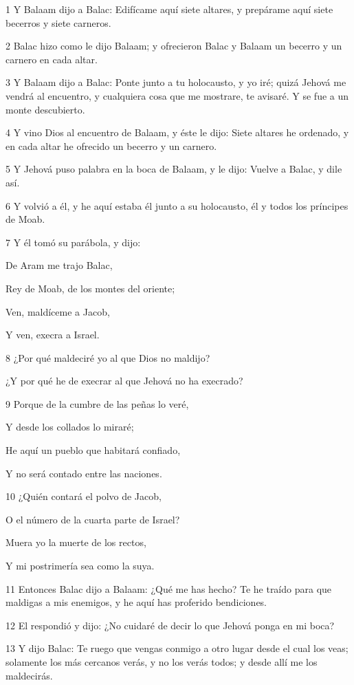 \par 1 Y Balaam dijo a Balac: Edifícame aquí siete altares, y prepárame aquí siete becerros y siete carneros.
\par 2 Balac hizo como le dijo Balaam; y ofrecieron Balac y Balaam un becerro y un carnero en cada altar.
\par 3 Y Balaam dijo a Balac: Ponte junto a tu holocausto, y yo iré; quizá Jehová me vendrá al encuentro, y cualquiera cosa que me mostrare, te avisaré. Y se fue a un monte descubierto.
\par 4 Y vino Dios al encuentro de Balaam, y éste le dijo: Siete altares he ordenado, y en cada altar he ofrecido un becerro y un carnero.
\par 5 Y Jehová puso palabra en la boca de Balaam, y le dijo: Vuelve a Balac, y dile así.
\par 6 Y volvió a él, y he aquí estaba él junto a su holocausto, él y todos los príncipes de Moab.
\par 7 Y él tomó su parábola, y dijo:
\par De Aram me trajo Balac,
\par Rey de Moab, de los montes del oriente;
\par Ven, maldíceme a Jacob,
\par Y ven, execra a Israel.
\par 8 ¿Por qué maldeciré yo al que Dios no maldijo?
\par ¿Y por qué he de execrar al que Jehová no ha execrado?
\par 9 Porque de la cumbre de las peñas lo veré,
\par Y desde los collados lo miraré;
\par He aquí un pueblo que habitará confiado,
\par Y no será contado entre las naciones.
\par 10 ¿Quién contará el polvo de Jacob,
\par O el número de la cuarta parte de Israel?
\par Muera yo la muerte de los rectos,
\par Y mi postrimería sea como la suya.
\par 11 Entonces Balac dijo a Balaam: ¿Qué me has hecho? Te he traído para que maldigas a mis enemigos, y he aquí has proferido bendiciones.
\par 12 El respondió y dijo: ¿No cuidaré de decir lo que Jehová ponga en mi boca?
\par 13 Y dijo Balac: Te ruego que vengas conmigo a otro lugar desde el cual los veas; solamente los más cercanos verás, y no los verás todos; y desde allí me los maldecirás.
